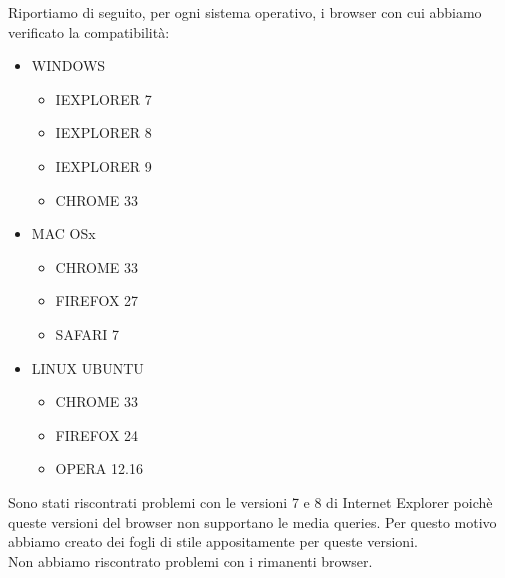 Riportiamo di seguito, per ogni sistema operativo, i browser con cui abbiamo verificato la compatibilit\`a:
\begin{itemize}
		\item WINDOWS
		\begin{itemize}
			\item IEXPLORER 7
			\item IEXPLORER 8
			\item IEXPLORER 9
			\item CHROME 33
		\end{itemize}
		\item MAC OSx
		\begin{itemize}
			\item CHROME 33
			\item FIREFOX 27
			\item SAFARI 7
		\end{itemize}
		\item LINUX UBUNTU
		\begin{itemize}
			\item CHROME 33
			\item FIREFOX 24
			\item OPERA 12.16
		\end{itemize}
\end{itemize}

Sono stati riscontrati problemi con le versioni 7 e 8 di Internet Explorer poich\`e queste versioni del browser non supportano le media queries. Per questo motivo abbiamo creato dei fogli di stile appositamente per queste versioni.
\\Non abbiamo riscontrato problemi con i rimanenti browser.
